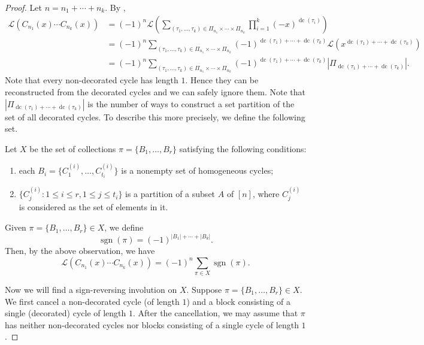 \documentclass[oneside]{book}
\numberwithin{equation}{section}
\theoremstyle{definition}
\newcommand\dc{\operatorname{dc}}
\newcommand\sgn{\operatorname{sgn}}
\newcommand\LL{\mathcal{L}}
\begin{document}
\begin{proof}
  Let \( n= n_1 + \cdots + n_k \). By ,
  \begin{align*}
    \LL \left( C_{n_1}(x)\cdots C_{n_k}(x) \right)
    & =  (-1)^n \LL\left( \sum_{(\tau_1,\dots,\tau_k)\in \Pi_{n_1} \times \cdots \times \Pi_{n_k}}
      \prod_{i=1}^{k} (-x)^{\dc(\tau_i)} \right)\\
    & =  (-1)^n \sum_{(\tau_1,\dots,\tau_k)\in \Pi_{n_1} \times \cdots \times \Pi_{n_k}}
      (-1)^{\dc(\tau_1) + \cdots + \dc(\tau_k)}\LL\left( 
      x^{\dc(\tau_1) + \cdots + \dc(\tau_k)} \right)\\
    & =  (-1)^n \sum_{(\tau_1,\dots,\tau_k)\in \Pi_{n_1} \times \cdots \times \Pi_{n_k}}
      (-1)^{\dc(\tau_1) + \cdots + \dc(\tau_k)}
      |\Pi_{\dc(\tau_1) + \cdots + \dc(\tau_k)}|.
\end{align*}
Note that every non-decorated cycle has length \( 1 \). Hence they can
be reconstructed from the decorated cycles and we can safely ignore
them. Note that \( |\Pi_{\dc(\tau_1) + \cdots + \dc(\tau_k)}| \) is
the number of ways to construct a set partition of the set of all
decorated cycles. To describe this more precisely, we define the
following set.

Let \( X \) be the set of collections \( \pi = \{ B_1,\dots,B_r\} \)
satisfying the following conditions:
\begin{enumerate}
\item each \( B_i = \{ C^{(i)}_{1},\dots,C^{(i)}_{t_i}\} \) is a
  nonempty set of homogeneous cycles;
\item \( \{C^{(i)}_j: 1\le i\le r, 1\le j\le t_i\} \) is a partition
  of a subset \( A \) of \( [n] \), where \( C^{(i)}_j \) is
  considered as the set of elements in it.
\end{enumerate}
Given \( \pi = \{ B_1,\dots,B_r\}\in X \),
we define
\[
  \sgn(\pi) = (-1)^{|B_1| + \cdots + |B_k|}.
\]
Then, by the above observation, we have
\begin{equation}\label{eq:76}
    \LL \left( C_{n_1}(x)\cdots C_{n_k}(x) \right)
    = (-1)^{n} \sum_{\pi \in X}  \sgn(\pi).
\end{equation}

Now we will find a sign-reversing involution on \( X \). Suppose
\( \pi = \{ B_1,\dots,B_r\}\in X \). We first cancel a non-decorated
cycle (of length \( 1 \)) and a block consisting of a single
(decorated) cycle of length \( 1 \). After the cancellation, we may
assume that \( \pi \) has neither non-decorated cycles nor blocks
consisting of a single cycle of length \( 1 \).


\end{proof}
\end{document}

